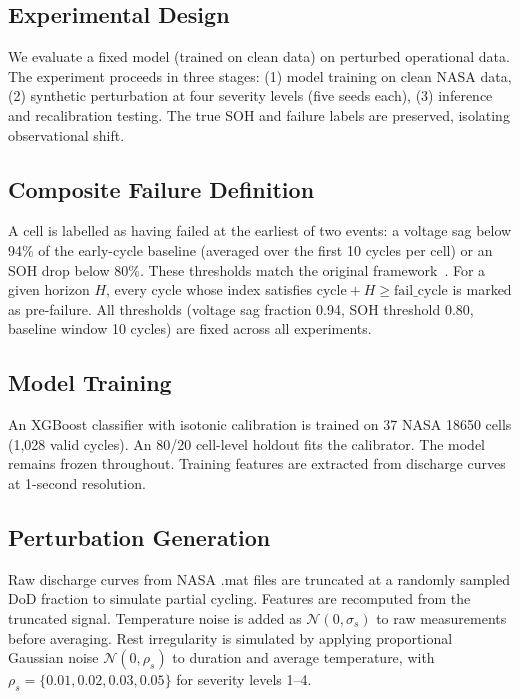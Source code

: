 \documentclass[11pt,a4paper]{article}
\begin{document}
\subsection{Experimental Design}

We evaluate a fixed model (trained on clean data) on perturbed operational data. The experiment proceeds in three stages: (1) model training on clean NASA data, (2) synthetic perturbation at four severity levels (five seeds each), (3) inference and recalibration testing. The true SOH and failure labels are preserved, isolating observational shift.

\subsection{Composite Failure Definition}

A cell is labelled as having failed at the earliest of two events: a voltage sag below 94\% of the early-cycle baseline (averaged over the first 10 cycles per cell) or an SOH drop below 80\%. These thresholds match the original framework~\cite{shikdar2026learning}. For a given horizon \(H\), every cycle whose index satisfies \(\text{cycle} + H \geq \text{fail\_cycle}\) is marked as pre-failure. All thresholds (voltage sag fraction 0.94, SOH threshold 0.80, baseline window 10 cycles) are fixed across all experiments.

\subsection{Model Training}

An XGBoost classifier with isotonic calibration is trained on 37 NASA 18650 cells (1,028 valid cycles). An 80/20 cell-level holdout fits the calibrator. The model remains frozen throughout. Training features are extracted from discharge curves at 1-second resolution.

\subsection{Perturbation Generation}

Raw discharge curves from NASA .mat files are truncated at a randomly sampled DoD fraction to simulate partial cycling. Features are recomputed from the truncated signal. Temperature noise is added as \(\mathcal{N}(0, \sigma_s)\) to raw measurements before averaging. Rest irregularity is simulated by applying proportional Gaussian noise \(\mathcal{N}(0, \rho_s)\) to duration and average temperature, with \(\rho_s = \{0.01, 0.02, 0.03, 0.05\}\) for severity levels 1--4.
\end{document}
